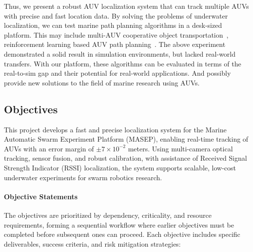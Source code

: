 \documentclass[11pt]{article}
\newcommand{\cn}[1]{\begin{CJK}{UTF8}{gbsn}#1\end{CJK}}
\newcommand{\yh}[1]{\noindent{\color{blue}\textbf{yh: }{\cn{#1}}}}
\begin{document}
        Thus, we present a robust AUV localization system that can track multiple AUVs with precise and fast location data.
        By solving the problems of underwater localization, we can test marine path planning algorithms in a desk-sized platform. This may include multi-AUV cooperative object transportation~\cite{zhang_decentralized_2020}, reinforcement learning based AUV path planning~\cite{yang_intelligent_2023}. The above experiment demonstrated a solid result in simulation environments, but lacked real-world transfers. With our platform, these algorithms can be evaluated in terms of the real-to-sim gap and their potential for real-world applications. And possibly provide new solutions to the field of marine research using AUVs.
    \subsection{Objectives }
        This project develops a fast and precise localization system for the Marine Automatic Swarm Experiment Platform (MASEP), enabling real-time tracking of AUVs with an error margin of $\pm 7\times 10^{-2}$ meters. Using multi-camera optical tracking, sensor fusion, and robust calibration, with assistance of Received Signal Strength Indicator (RSSI) localization,
        the system supports scalable, low-cost underwater experiments for swarm robotics research.
    \paragraph{Objective Statements}
    The objectives are prioritized by dependency, criticality, and resource requirements, forming a sequential workflow where earlier objectives must be completed before subsequent ones can proceed. Each objective includes specific deliverables, success criteria, and risk mitigation strategies:
\end{document}
